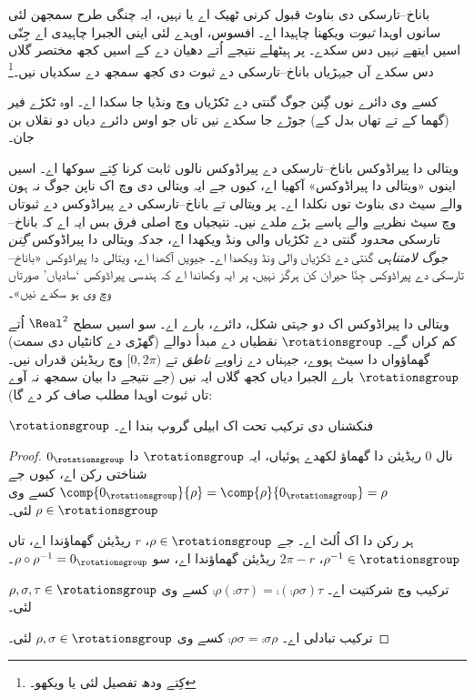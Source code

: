 \documentclass[../../../include/open-logic-section]{subfiles}
\begin{document}

باناخ–تارسکی دی بناوٹ قبول کرنی ٹھیک اے یا نہیں، ایہ چنگی طرح سمجھن لئی سانوں اوہدا \emph{ثبوت} ویکھنا چاہیدا اے۔ افسوس، اوہدے لئی اینی الجبرا چاہیدی اے جِنّی اسیں ایتھے نہیں دس سکدے۔ پر ہِیٹھلے نتیجے اُتے دھیان دے کے اسیں کجھ مختصر گلاں دس سکدے آں جیہڑیاں باناخ–تارسکی دے ثبوت دی کجھ سمجھ دے سکدیاں نیں۔\footnote{کِتے ودھ تفصیل لئی \cite{Weston2003} یا \cite{Wagon2016} ویکھو۔}

\begin{thm}
کسے وی دائرے نوں گِنن جوگ گنتی دے ٹکڑیاں وچ ونڈیا جا سکدا اے۔ اوہ ٹکڑے فیر (گھما کے تے تھاں بدل کے) جوڑے جا سکدے نیں تاں جو اوس دائرے دیاں دو نقلاں بن جان۔
\end{thm}

ویتالی دا پیراڈوکس باناخ–تارسکی دے پیراڈوکس نالوں ثابت کرنا کِتے سوکھا اے۔ اسیں اینوں «ویتالی دا پیراڈوکس» آکھیا اے، کیوں جے ایہ ویتالی دی \citeyear{Vitali1905} وچ اک ناپن جوگ نہ ہون والے سیٹ دی بناوٹ توں نکلدا اے۔ پر ویتالی تے باناخ–تارسکی دے پیراڈوکس دے ثبوتاں وچ سیٹ نظریے والے پاسے بڑے ملدے نیں۔ نتیجیاں وچ اصلی فرق بس ایہ اے کہ باناخ–تارسکی \emph{محدود} گنتی دے ٹکڑیاں والی ونڈ ویکھدا اے، جدکہ ویتالی دا پیراڈوکس \emph{گِنن جوگ لامتناہی} گنتی دے ٹکڑیاں والی ونڈ ویکھدا اے۔ جیویں \citet{Weston2003} آکھدا اے، ویتالی دا پیراڈوکس «باناخ–تارسکی دے پیراڈوکس جِنّا حیران کن ہرگز نہیں، پر ایہ وکھاندا اے کہ ہندسی پیراڈوکس ‘سادیاں’ صورتاں وچ وی ہو سکدے نیں»۔

ویتالی دا پیراڈوکس اک دو جہتی شکل، دائرے، بارے اے۔ سو اسیں سطح $\Real^2$ اُتے کم کراں گے۔ $\rotationsgroup$ نقطیاں دے مبدأ دوالے (گھڑی دے کانٹیاں دی سمت) گھماؤواں دا سیٹ ہووے، جیہناں دے زاویے \emph{ناطق} تے $[0,2\pi)$ وچ ریڈیئن قدراں نیں۔ $\rotationsgroup$ بارے الجبرا دیاں کجھ گلاں ایہ نیں (جے نتیجے دا بیان سمجھ نہ آوے تاں ثبوت اوہدا مطلب صاف کر دے گا):

\begin{lem}
$\rotationsgroup$ فنکشناں دی ترکیب تحت اک ابیلی {گروپ} بندا اے۔
\end{lem}

\begin{proof}
$0_{\rotationsgroup}$ نال $0$ ریڈیئن دا گھماؤ لکھدے ہوئیاں، ایہ $\rotationsgroup$ دا شناختی رکن اے، کیوں جے
$\comp{0_{\rotationsgroup}}{\rho} = \comp{\rho}{0_{\rotationsgroup}} =
\rho$ کسے وی $\rho \in \rotationsgroup$ لئی۔

ہر رکن دا اک اُلٹ اے۔ جے $\rho \in \rotationsgroup$، $r$ ریڈیئن گھماؤندا اے، تاں $\rho^{-1} \in \rotationsgroup$، $2\pi - r$ ریڈیئن گھماؤندا اے، سو $\rho \circ \rho^{-1} = 0_\rotationsgroup$۔

ترکیب وچ شرکتیت اے۔ $\comp{\rho}{(\comp{\sigma}{\tau})} =
\comp{(\comp{\rho}{\sigma})}{\tau}$ کسے وی $\rho, \sigma, \tau \in
\rotationsgroup$ لئی۔

ترکیب تبادلی اے۔ $\comp{\rho}{\sigma} =
\comp{\sigma}{\rho}$ کسے وی $\rho, \sigma \in \rotationsgroup$ لئی۔
\end{proof}
\end{document}
